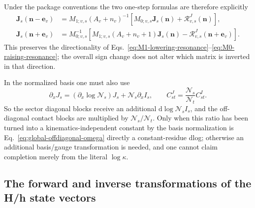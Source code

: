 \documentclass[11pt,a4paper]{article}
\newcommand{\dd}{\mathrm d}
\newcommand{\cR}{\mathcal R}
\newcommand{\cN}{\mathcal N}
\begin{document}
Under the package conventions the two one-step formulas are therefore explicitly
\begin{align}
 \bm J_s(\bm n-\bm e_v)
 &=M_{1;v,s}(A_v+n_v)^{-1}
 \left[M_{0;v,s}\bm J_s(\bm n)+\cR^J_{v,s}(\bm n)\right],
 \label{eq:package-lowering}\\
 \bm J_s(\bm n+\bm e_v)
 &=M_{0;v,s}^{-1}
 \left[M_{1;v,s}(A_v+n_v+1)\bm J_s(\bm n)
 -\cR^J_{v,s}(\bm n+\bm e_v)\right].
 \label{eq:package-raising}
\end{align}
This preserves the directionality of Eqs.~\eqref{eq:M1-lowering-resonance}--\eqref{eq:M0-raising-resonance}; the overall sign change does not alter which matrix is inverted in that direction.

In the normalized basis one must also use
\begin{equation}
 \partial_xJ_s
 =(\partial_x\log\cN_s)J_s+\cN_s\partial_xI_s,
 \qquad
 C^{J}_{st}=\frac{\cN_s}{\cN_t}C^{I}_{st}.
 \label{eq:normalization-adapter}
\end{equation}
So the sector diagonal blocks receive an additional $\dd\log\cN_sI_s$, and the off-diagonal contact blocks are multiplied by $\cN_s/\cN_t$. Only when this ratio has been turned into a kinematics-independent constant by the basis normalization is Eq.~\eqref{eq:global-offdiagonal-omega} directly a constant-residue dlog; otherwise an additional basis/gauge transformation is needed, and one cannot claim completion merely from the literal $\log\kappa$.

\subsection{The forward and inverse transformations of the H/h state vectors}
\end{document}
